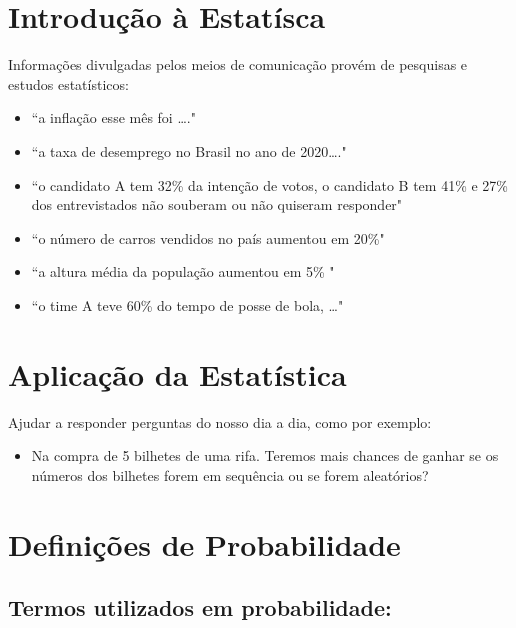 \documentclass[
]{book}
\providecommand{\tightlist}{%
  \setlength{\itemsep}{0pt}\setlength{\parskip}{0pt}}
\begin{document}
\hypertarget{introduuxe7uxe3o-uxe0-estatuxedsca}{%
\section{Introdução à Estatísca}\label{introduuxe7uxe3o-uxe0-estatuxedsca}}

Informações divulgadas pelos meios de comunicação provém de pesquisas e estudos estatísticos:

\begin{itemize}
\item
  ``a inflação esse mês foi \ldots."
\item
  ``a taxa de desemprego no Brasil no ano de 2020\ldots."
\item
  ``o candidato A tem 32\% da intenção de votos, o candidato B tem 41\% e 27\% dos entrevistados não souberam ou não quiseram responder"
\item
  ``o número de carros vendidos no país aumentou em 20\%"
\item
  ``a altura média da população aumentou em 5\% "
\item
  ``o time A teve 60\% do tempo de posse de bola, \ldots"
\end{itemize}

\hypertarget{aplicauxe7uxe3o-da-estatuxedstica}{%
\section{Aplicação da Estatística}\label{aplicauxe7uxe3o-da-estatuxedstica}}

Ajudar a responder perguntas do nosso dia a dia, como por exemplo:

\begin{itemize}
\tightlist
\item
  Na compra de 5 bilhetes de uma rifa. Teremos mais chances de ganhar se os números dos bilhetes forem em sequência ou se forem aleatórios?
\end{itemize}

\hypertarget{definiuxe7uxf5es-de-probabilidade}{%
\section{Definições de Probabilidade}\label{definiuxe7uxf5es-de-probabilidade}}

\hypertarget{termos-utilizados-em-probabilidade}{%
\subsection*{Termos utilizados em probabilidade:}\label{termos-utilizados-em-probabilidade}}
\end{document}
